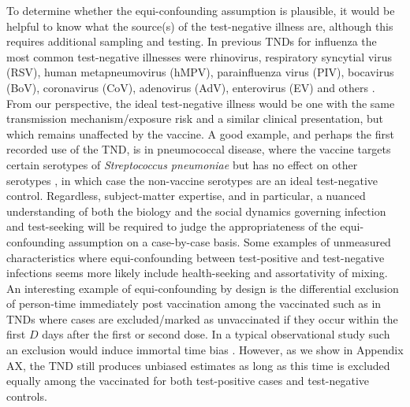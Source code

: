 \documentclass[11pt]{article}
\begin{document}
To determine whether the equi-confounding assumption is plausible, it would be helpful to know what the source(s) of the test-negative illness are, although this requires additional sampling and testing. In previous TNDs for influenza the most common test-negative illnesses were rhinovirus, respiratory syncytial virus (RSV), human metapneumovirus (hMPV), parainfluenza virus (PIV), bocavirus (BoV), coronavirus (CoV), adenovirus (AdV), enterovirus (EV) and others \cite{chua_use_2020-1}. From our perspective, the ideal test-negative illness would be one with the same transmission mechanism/exposure risk and a similar clinical presentation, but which remains unaffected by the vaccine. A good example, and perhaps the first recorded use of the TND, is in pneumococcal disease, where the vaccine targets certain serotypes of \textit{Streptococcus pneumoniae} but has no effect on other serotypes \cite{broome_pneumococcal_1980}, in which case the non-vaccine serotypes are an ideal test-negative control. Regardless, subject-matter expertise, and in particular, a nuanced understanding of both the biology and the social dynamics governing infection and test-seeking will be required to judge the appropriateness of the equi-confounding assumption on a case-by-case basis. Some examples of unmeasured characteristics where equi-confounding between test-positive and test-negative infections seems more likely include health-seeking and assortativity of mixing. An interesting example of equi-confounding by design is the differential exclusion of person-time immediately post vaccination among the vaccinated such as in TNDs where cases are excluded/marked as unvaccinated if they occur within the first $D$ days after the first or second dose. In a typical observational study such an exclusion would induce immortal time bias \cite{suissa_immortal_2008}. However, as we show in Appendix AX, the TND still produces unbiased estimates as long as this time is excluded equally among the vaccinated for both test-positive cases and test-negative controls. 
\end{document}
